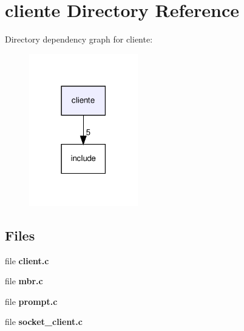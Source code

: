 \section{cliente Directory Reference}
\label{dir_ee23875512b03122aad1d4f8be53eb59}
Directory dependency graph for cliente\+:\nopagebreak
\begin{figure}[H]
\begin{center}
\leavevmode
\includegraphics[width=134pt]{dir_ee23875512b03122aad1d4f8be53eb59_dep}
\end{center}
\end{figure}
\subsection*{Files}
\begin{DoxyCompactItemize}
\item 
file \textbf{ client.\+c}
\item 
file \textbf{ mbr.\+c}
\item 
file \textbf{ prompt.\+c}
\item 
file \textbf{ socket\+\_\+client.\+c}
\end{DoxyCompactItemize}
